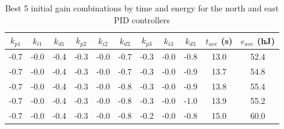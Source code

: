\begin{table}[h]
    \centering
    \begin{tabular}{|c|c|c|c|c|c|c|c|c|c|c|}
    	\hline $k_{p1}$ & $k_{i1}$ & $k_{d1}$ & $k_{p2}$ & $k_{i2}$ & $k_{d2}$ & $k_{p3}$ & $k_{i3}$ & $k_{d3}$ & $t_{ave}$ (s) & $e_{ave}$ (hJ) \\\hline
    	-0.7 & -0.0 & -0.4 & -0.3 & -0.0 & -0.7 & -0.3 & -0.0 & -0.8 & 13.0 & 52.4 \\\hline
    	-0.7 & -0.0 & -0.4 & -0.3 & -0.0 & -0.7 & -0.3 & -0.0 & -0.9 & 13.7 & 54.8 \\\hline
    	-0.7 & -0.0 & -0.4 & -0.3 & -0.0 & -0.8 & -0.3 & -0.0 & -0.9 & 13.8 & 55.4 \\\hline
    	-0.7 & -0.0 & -0.4 & -0.3 & -0.0 & -0.8 & -0.3 & -0.0 & -1.0 & 13.9 & 55.2 \\\hline
    	-0.7 & -0.0 & -0.4 & -0.3 & -0.0 & -0.8 & -0.2 & -0.0 & -0.8 & 15.0 & 60.0 \\\hline
    \end{tabular}
    \caption{Best 5 initial gain combinations by time and energy for the north and east PID controllers}
    \label{tab:initial_ne_gains}
\end{table}

